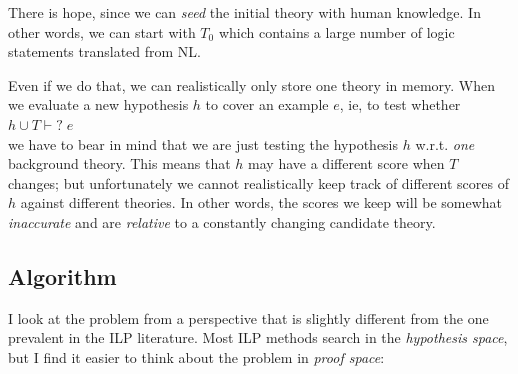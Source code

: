 \documentclass[a4paper]{report}
\begin{document}
There is hope, since we can \textit{seed} the initial theory with human knowledge.  In other words, we can start with $T_0$ which contains a large number of logic statements translated from NL.

Even if we do that, we can realistically only store one theory in memory.  When we evaluate a new hypothesis $h$ to cover an example $e$, ie, to test whether\\
\hspace*{1cm} $h \cup T \vdash ? \; e $\\
we have to bear in mind that we are just testing the hypothesis $h$ w.r.t. \textit{one} background theory.  This means that $h$ may have a different score when $T$ changes;  but unfortunately we cannot realistically keep track of different scores of $h$ against different theories.  In other words, the scores we keep will be somewhat \textit{inaccurate} and are \textit{relative} to a constantly changing candidate theory.

%
%
%
%
%
%

\subsection{Algorithm}

I look at the problem from a perspective that is slightly different from the one prevalent in the ILP literature.  Most ILP methods search in the \textit{hypothesis space}, but I find it easier to think about the problem in \textit{proof space}:\\
\end{document}
